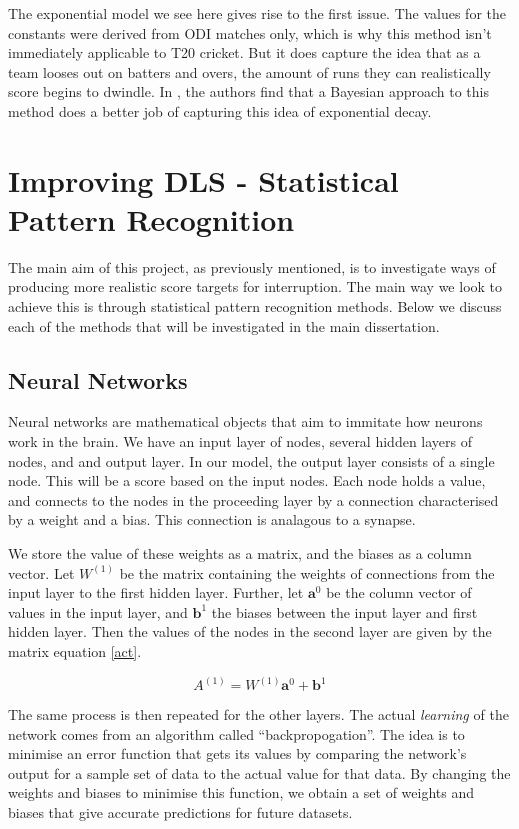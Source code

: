 \documentclass[11pt]{amsart}
\begin{document}
The exponential model we see here gives rise to the first issue. The values for the constants were derived from ODI matches only, which is why this method 
isn't immediately applicable to T20 cricket. But it does capture the idea that as a team looses out on batters and overs, the amount of runs they can realistically score
begins to dwindle. In \cite{dlbayes}, the authors find that a Bayesian approach to this method does a better job of capturing this idea of exponential decay. 

\section{Improving DLS - Statistical Pattern Recognition}

The main aim of this project, as previously mentioned, is to investigate ways of producing more realistic score targets for interruption. The main way we look to 
achieve this is through statistical pattern recognition methods. Below we discuss each of the methods that will be investigated in the main dissertation.

\subsection{Neural Networks}
Neural networks are mathematical objects that aim to immitate how neurons work in the brain. We have an input layer of nodes, several hidden layers of nodes, and and output layer. In 
our model, the output layer consists of a single node. This will be a score based on the input nodes. Each node holds a value, and connects to the nodes in the proceeding
layer by a connection characterised by a weight and a bias. This connection is analagous to a synapse. 

We store the value of these weights as a matrix, and the biases as a column vector. Let $W^{(1)}$ be the matrix containing the weights of connections from the input layer to the first hidden layer. Further, let
$\textbf{a}^0$ be the column vector of values in the input layer, and $\textbf{b}^1$ the biases between the input layer and first hidden layer. Then the values of the nodes in the second 
layer are given by the matrix equation \ref{act}.

\begin{equation}
    \label{act}
    A^{(1)} = W^{(1)}\textbf{a}^0 + \textbf{b}^1
\end{equation}

The same process is then repeated for the other layers. The actual \textit{learning} of the network comes from an algorithm called ``backpropogation''.
The idea is to minimise an error function that gets its values by comparing the network's output for a sample set of data to the actual value for that data. By changing 
the weights and biases to minimise this function, we obtain a set of weights and biases that give accurate predictions for future datasets. \\
\end{document}
